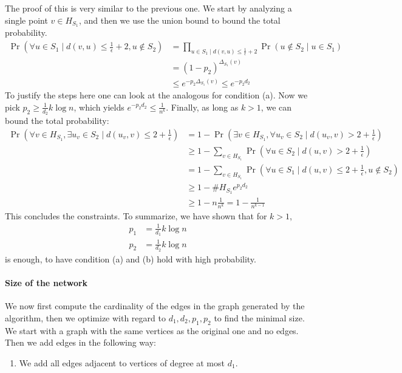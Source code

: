 \documentclass[11pt]{article}
\begin{document}
\begin{enumerate}
\begin{enumerate}
        The proof of this is very similar to the previous one. We start by analyzing a single point $v \in H_{S_1}$, and then we use the union bound to bound the total probability. 
        \begin{align*}
            \Pr\left(\forall u \in S_1 \mid d(v, u) \leq \frac{1}{\epsilon}+2, u \notin S_2\right)& = \prod_{u \in S_1 \mid d(v, u) \leq \frac{1}{\epsilon}+2} \Pr\left(u \notin S_2 \mid u \in S_1\right)\\
            & = (1-p_2)^{\Delta_{S_1}(v)} \\
            & \leq e^{-p_2\Delta_{S_1}(v)} \leq e^{-p_2d_2}
        \end{align*}
        To justify the steps here one can look at the analogous for condition (a). Now we pick $p_2 \geq \frac{1}{d_2}k\log n$, which yields $e^{-p_2d_2}\leq \frac{1}{n^k}$. Finally, as long as $k>1$, we can bound the total probability:
            \begin{align*}
                \Pr\left(\forall v \in H_{S_1}, \exists u_v \in S_2 \mid d(u_v,v) \leq 2+\frac{1}{\epsilon} \right) &= 1-\Pr\left(\exists v \in H_{S_1},  \forall u_v \in S_2 \mid d(u_v,v) > 2+\frac{1}{\epsilon} \right)\\
                &\geq 1 - \sum_{v\in H_{S_1}}\Pr\left(\forall u \in S_2 \mid d(u,v) > 2+\frac{1}{\epsilon}\right) \\
                &= 1 - \sum_{v\in H_{S_1}}\Pr\left(\forall u \in S_1 \mid d(u,v) \leq 2+\frac{1}{\epsilon}, u \notin S_2\right) \\
                &\geq 1 - \# H_{S_1} e^{p_2d_2}\\
                &\geq 1 - n\frac{1}{n^k}=1-\frac{1}{n^{k-1}}
            \end{align*}
        This concludes the constraints. To summarize, we have shown that for $k>1$, 
        \begin{align*}
            p_1 &= \frac{1}{d_1}k\log n\\
            p_2 &= \frac{1}{d_2}k\log n
        \end{align*} 
        is enough, to have condition (a) and (b) hold with high probability. 

    \end{enumerate}
        \paragraph*{Size of the network}
        We now first compute the cardinality of the edges in the graph generated by the algorithm, then we optimize with regard to $d_1,d_2,p_1,p_2$ to find the minimal size. We start with a graph with the same vertices as the original one and no edges. Then we add edges in the following way:
        \begin{enumerate}
            \item We add all edges adjacent to vertices of degree at most $d_1$.
            

\end{enumerate}
\end{enumerate}
\end{document}
